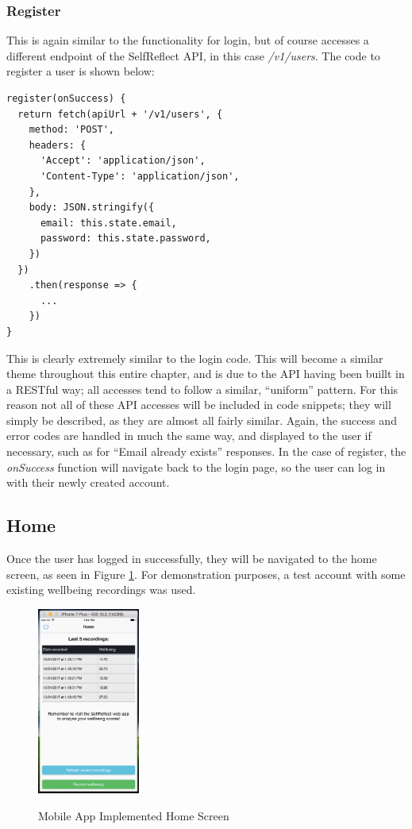 \documentclass[11pt,openright,a4paper]{report}
\begin{document}
\newpage
\subsubsection{Register}
This is again similar to the functionality for login, but of course accesses a different endpoint of the SelfReflect API, in this case \emph{/v1/users}. The code to register a user is shown below:
\begin{lstlisting}
register(onSuccess) {
  return fetch(apiUrl + '/v1/users', {
    method: 'POST',
    headers: {
      'Accept': 'application/json',
      'Content-Type': 'application/json',
    },
    body: JSON.stringify({
      email: this.state.email,
      password: this.state.password,
    })
  })
    .then(response => {
      ...
    })
}
\end{lstlisting}

This is clearly extremely similar to the login code. This will become a similar theme throughout this entire chapter, and is due to the API having been buillt in a RESTful way; all accesses tend to follow a similar, \enquote{uniform} pattern. For this reason not all of these API accesses will be included in code snippets; they will simply be described, as they are almost all fairly similar. Again, the success and error codes are handled in much the same way, and displayed to the user if necessary, such as for \enquote{Email already exists} responses. In the case of register, the \emph{onSuccess} function will navigate back to the login page, so the user can log in with their newly created account.

\subsection{Home}
Once the user has logged in successfully, they will be navigated to the home screen, as seen in Figure \ref{fig:mobilehomeimpl}. For demonstration purposes, a test account with some existing wellbeing recordings was used.

\begin{figure}[ht]
\centering
\caption{Mobile App Implemented Home Screen}
\includegraphics[width=0.3\textwidth]{i/mobilehomeimpl.png}
\label{fig:mobilehomeimpl}
\end{figure}
\end{document}
